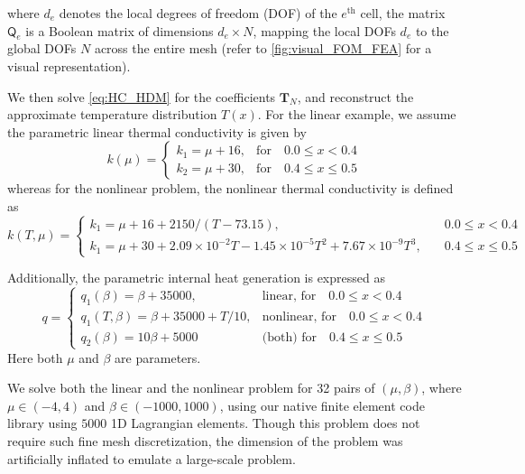 \documentclass[11pt]{article}
\renewcommand{\vec}[1]{\mathbf{#1}}
\newcommand{\mat}[1]{\mathsf{#1}}
\begin{document}
    where  \( d_e \) denotes the local degrees of freedom (DOF) of the \( e^{\text{th}} \) cell, the matrix \( \mat{Q}_e \) is a Boolean matrix of dimensions \( d_e \times N \), mapping the local DOFs \( d_e \) to the global DOFs \( N \) across the entire mesh (refer to \cref{fig:visual_FOM_FEA} for a visual representation).


    We then solve \cref{eq:HC_HDM} for the coefficients \( \vec{T}_N \), and reconstruct the approximate temperature distribution \( T(x) \).
    For the linear example, we assume the parametric linear thermal conductivity is given by
    \begin{equation}
    k(\mu) =
    \begin{cases}
        k_1 = \mu + 16, & \text{for} \quad 0.0 \leq x < 0.4   \\
        k_2 = \mu + 30, & \text{for} \quad 0.4 \leq x \leq 0.5
    \end{cases}
    \label{eq:k_mu_L}
    \end{equation}
    whereas for the nonlinear problem, the nonlinear thermal conductivity is defined as
    \begin{equation}
    k(T,\mu) =
    \begin{cases}
        k_1 =\mu + 16 + 2150/(T - 73.15),  &\quad 0.0 \leq x < 0.4 \\
        k_1 =\mu + 30 + 2.09 \times 10^{-2} T - 1.45 \times 10^{-5} T^2 + 7.67 \times 10^{-9} T^3, & \quad 0.4 \leq x \leq 0.5
    \end{cases}
    \label{eq:k_mu_NL}
    \end{equation}

    Additionally, the parametric internal heat generation is expressed as
    \begin{equation}
    q=
    \begin{cases}
        q_1(\beta) = \beta + 35000, & \text{linear, for} \quad 0.0 \leq x < 0.4 \\
        q_1(T,\beta) = \beta + 35000 + T/10, & \text{nonlinear, for} \quad 0.0 \leq x < 0.4 \\
        q_2(\beta) = 10\beta + 5000 & \text{(both) for} \quad 0.4 \leq x \leq 0.5
    \end{cases}
    \label{eq:q_beta}
    \end{equation}
    Here both $\mu$ and $\beta$ are parameters.


    We solve both the linear and the nonlinear problem for 32 pairs of $(\mu,\beta)$, where $\mu\in(-4,4)$ and $\beta\in(-1000,1000)$, using our native finite element code library using $5000$ 1D Lagrangian elements.
    Though this problem does not require such fine mesh discretization, the dimension of the problem was artificially inflated to emulate a large-scale problem.
\end{document}
